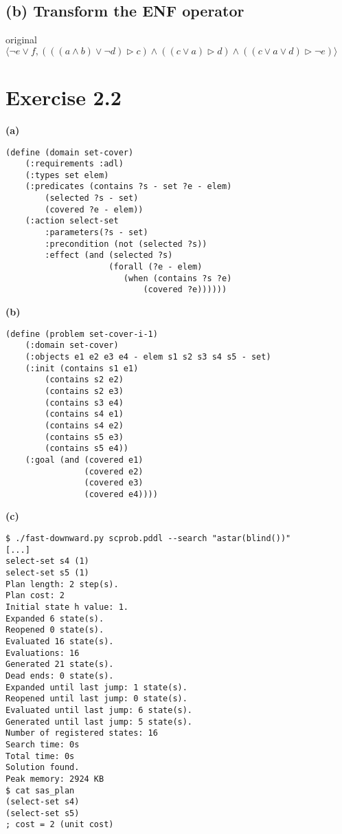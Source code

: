 \documentclass[11pt,a4paper]{article}
\begin{document}
\subsection*{(b) Transform the ENF operator}
original \newline
$ \langle
    \neg e \lor f ,
  (((a \land b) \lor \neg d) \triangleright c)   \land
  ((c \lor a) \triangleright d)  \land
  (( c \lor a \lor d) \triangleright \neg e)
  \rangle
$

\section*{Exercise 2.2}
\textbf{(a)}
\begin{lstlisting}[frame=single,basicstyle=\footnotesize,caption={set cover problem as a PDDL domain}]
(define (domain set-cover)
    (:requirements :adl)
    (:types set elem)
    (:predicates (contains ?s - set ?e - elem)
        (selected ?s - set)
        (covered ?e - elem))
    (:action select-set
        :parameters(?s - set)
        :precondition (not (selected ?s))
        :effect (and (selected ?s)
                     (forall (?e - elem)
                        (when (contains ?s ?e)
                            (covered ?e))))))
\end{lstlisting}
\textbf{(b)}
\begin{lstlisting}[frame=single,basicstyle=\footnotesize,caption={set cover instance as a PDDL problem}]
(define (problem set-cover-i-1)
    (:domain set-cover)
    (:objects e1 e2 e3 e4 - elem s1 s2 s3 s4 s5 - set)
    (:init (contains s1 e1)
        (contains s2 e2)
        (contains s2 e3)
        (contains s3 e4)
        (contains s4 e1)
        (contains s4 e2)
        (contains s5 e3)
        (contains s5 e4))
    (:goal (and (covered e1)
                (covered e2)
                (covered e3)
                (covered e4))))
\end{lstlisting}
\textbf{(c)}
\begin{lstlisting}[frame=single,basicstyle=\ttfamily\footnotesize,caption={solving set cover instance with fast-downward}]
$ ./fast-downward.py scprob.pddl --search "astar(blind())"
[...]
select-set s4 (1)
select-set s5 (1)
Plan length: 2 step(s).
Plan cost: 2
Initial state h value: 1.
Expanded 6 state(s).
Reopened 0 state(s).
Evaluated 16 state(s).
Evaluations: 16
Generated 21 state(s).
Dead ends: 0 state(s).
Expanded until last jump: 1 state(s).
Reopened until last jump: 0 state(s).
Evaluated until last jump: 6 state(s).
Generated until last jump: 5 state(s).
Number of registered states: 16
Search time: 0s
Total time: 0s
Solution found.
Peak memory: 2924 KB
$ cat sas_plan
(select-set s4)
(select-set s5)
; cost = 2 (unit cost)
\end{lstlisting}
\end{document}
